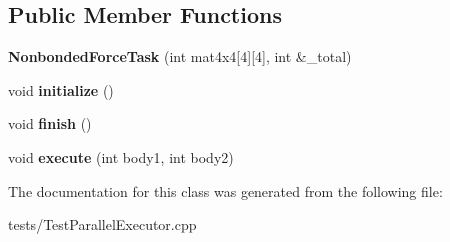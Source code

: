 \subsection*{Public Member Functions}
\begin{DoxyCompactItemize}
\item 
{\bfseries Nonbonded\+Force\+Task} (int mat4x4\mbox{[}4\mbox{]}\mbox{[}4\mbox{]}, int \&\+\_\+total)\hypertarget{classNonbondedForceTask_a343846e6c771df61e839f308e871e106}{}\label{classNonbondedForceTask_a343846e6c771df61e839f308e871e106}

\item 
void {\bfseries initialize} ()\hypertarget{classNonbondedForceTask_a8e0d4a4ed119acdcf0321f838f21e352}{}\label{classNonbondedForceTask_a8e0d4a4ed119acdcf0321f838f21e352}

\item 
void {\bfseries finish} ()\hypertarget{classNonbondedForceTask_a3efba9c05eec3d517a2f74510f24a596}{}\label{classNonbondedForceTask_a3efba9c05eec3d517a2f74510f24a596}

\item 
void {\bfseries execute} (int body1, int body2)\hypertarget{classNonbondedForceTask_a58d621a99f49bddad3405fe15d4e6cc1}{}\label{classNonbondedForceTask_a58d621a99f49bddad3405fe15d4e6cc1}

\end{DoxyCompactItemize}


The documentation for this class was generated from the following file\+:\begin{DoxyCompactItemize}
\item 
tests/Test\+Parallel\+Executor.\+cpp\end{DoxyCompactItemize}
